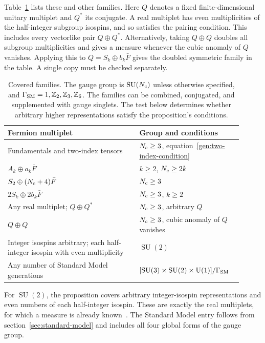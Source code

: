 \documentclass[11pt,a4paper]{article}
\theoremstyle{remark}
\DeclareMathOperator{\SU}{SU}
\begin{document}
Table~\ref{tab:general-families} lists these and other families.
Here $Q$ denotes a fixed finite-dimensional unitary multiplet and $Q^*$
its conjugate. A real multiplet has even multiplicities of the
half-integer subgroup isospins, and so satisfies the pairing condition.
This includes every vectorlike pair $Q\oplus Q^*$. Alternatively,
taking $Q\oplus Q$ doubles all subgroup multiplicities and gives a
measure whenever the cubic anomaly of $Q$ vanishes. Applying this to
$Q=S_k\oplus b_k\bar F$ gives the doubled symmetric family in the
table. A single copy must be checked separately.

\begin{table}[htbp]
\centering
\renewcommand{\arraystretch}{1.2}
\begin{tabular}{p{0.53\linewidth}p{0.38\linewidth}}
\hline
Fermion multiplet & Group and conditions \\
\hline
Fundamentals and two-index tensors &
$N_{\rm c}\ge3$, equation~\eqref{gen:two-index-condition} \\
$A_k\oplus a_k\bar F$ & $k\ge2$, $N_{\rm c}\ge2k$ \\
$S_2\oplus(N_{\rm c}+4)\bar F$ & $N_{\rm c}\ge3$ \\
$2S_k\oplus2b_k\bar F$ & $N_{\rm c}\ge3$, $k\ge2$ \\
Any real multiplet; $Q\oplus Q^*$ & $N_{\rm c}\ge3$, arbitrary $Q$ \\
$Q\oplus Q$ & {\raggedright $N_{\rm c}\ge3$, cubic anomaly of $Q$ vanishes\par} \\
{\raggedright Integer isospins arbitrary; each half-integer isospin with even multiplicity\par}
 & $\SU(2)$ \\
Any number of Standard Model generations &
$[\SU(3)\times\SU(2)\times\mathrm{U}(1)]/\Gamma_{\rm SM}$ \\
\hline
\end{tabular}
\caption{Covered families. The gauge group is $\SU(N_{\rm c})$
unless otherwise specified, and
$\Gamma_{\rm SM}=1,\mathbb Z_2,\mathbb Z_3,\mathbb Z_6$.
The families can be combined, conjugated, and supplemented with gauge
singlets. The test below determines whether arbitrary higher
representations satisfy the proposition's conditions.}
\label{tab:general-families}
\end{table}

For $\SU(2)$, the proposition covers arbitrary integer-isospin
representations and even numbers of each half-integer isospin. These are exactly the real multiplets, for which a measure is
already known~\cite{SuzukiReal}. The Standard Model entry follows from
section~\ref{sec:standard-model} and includes all four global forms of
the gauge group.
\end{document}

